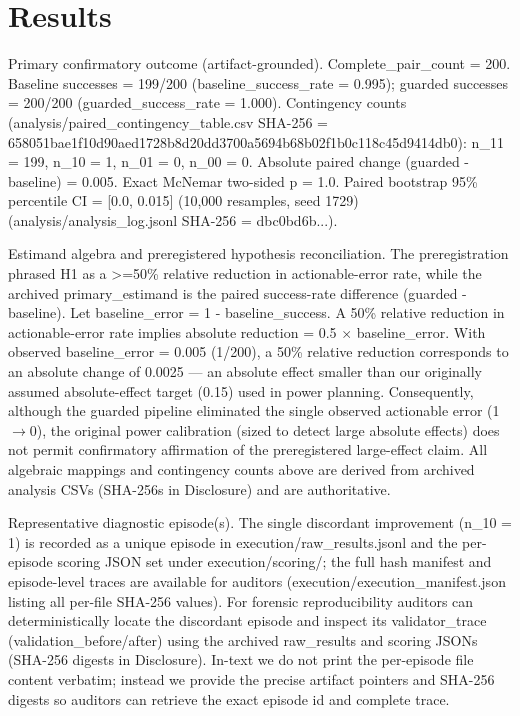 \documentclass[conference]{IEEEtran}
\begin{document}
\section{Results}
Primary confirmatory outcome (artifact-grounded). Complete\_pair\_count = 200. Baseline successes = 199/200 (baseline\_success\_rate = 0.995); guarded successes = 200/200 (guarded\_success\_rate = 1.000). Contingency counts (analysis/paired\_contingency\_table.csv SHA-256 = 658051bae1f10d90aed1728b8d20dd3700a5694b68b02f1b0c118c45d9414db0): n\_11 = 199, n\_10 = 1, n\_01 = 0, n\_00 = 0. Absolute paired change (guarded - baseline) = 0.005. Exact McNemar two-sided p = 1.0. Paired bootstrap 95\% percentile CI = [0.0, 0.015] (10,000 resamples, seed 1729) (analysis/analysis\_log.jsonl SHA-256 = dbc0bd6b...).

Estimand algebra and preregistered hypothesis reconciliation. The preregistration phrased H1 as a >=50\% relative reduction in actionable-error rate, while the archived primary\_estimand is the paired success-rate difference (guarded - baseline). Let baseline\_error = 1 - baseline\_success. A 50\% relative reduction in actionable-error rate implies absolute reduction = 0.5 \ensuremath{\times} baseline\_error. With observed baseline\_error = 0.005 (1/200), a 50\% relative reduction corresponds to an absolute change of 0.0025 --- an absolute effect smaller than our originally assumed absolute-effect target (0.15) used in power planning. Consequently, although the guarded pipeline eliminated the single observed actionable error (1\ensuremath{\rightarrow}0), the original power calibration (sized to detect large absolute effects) does not permit confirmatory affirmation of the preregistered large-effect claim. All algebraic mappings and contingency counts above are derived from archived analysis CSVs (SHA-256s in Disclosure) and are authoritative.

Representative diagnostic episode(s). The single discordant improvement (n\_10 = 1) is recorded as a unique episode in execution/raw\_results.jsonl and the per-episode scoring JSON set under execution/scoring/; the full hash manifest and episode-level traces are available for auditors (execution/execution\_manifest.json listing all per-file SHA-256 values). For forensic reproducibility auditors can deterministically locate the discordant episode and inspect its validator\_trace (validation\_before/after) using the archived raw\_results and scoring JSONs (SHA-256 digests in Disclosure). In-text we do not print the per-episode file content verbatim; instead we provide the precise artifact pointers and SHA-256 digests so auditors can retrieve the exact episode id and complete trace.
\end{document}
